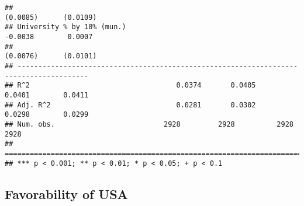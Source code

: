 \documentclass[
]{article}
\begin{document}
\begin{verbatim}
##                                                                 (0.0085)      (0.0109) 
## University % by 10% (mun.)                                      -0.0038        0.0007  
##                                                                 (0.0076)      (0.0101) 
## ---------------------------------------------------------------------------------------
## R^2                                   0.0374       0.0405        0.0401        0.0411  
## Adj. R^2                              0.0281       0.0302        0.0298        0.0299  
## Num. obs.                          2928         2928          2928          2928       
## =======================================================================================
## *** p < 0.001; ** p < 0.01; * p < 0.05; + p < 0.1
\end{verbatim}

\hypertarget{favorability-of-usa-3}{%
\subsection{Favorability of USA}\label{favorability-of-usa-3}}
\end{document}
